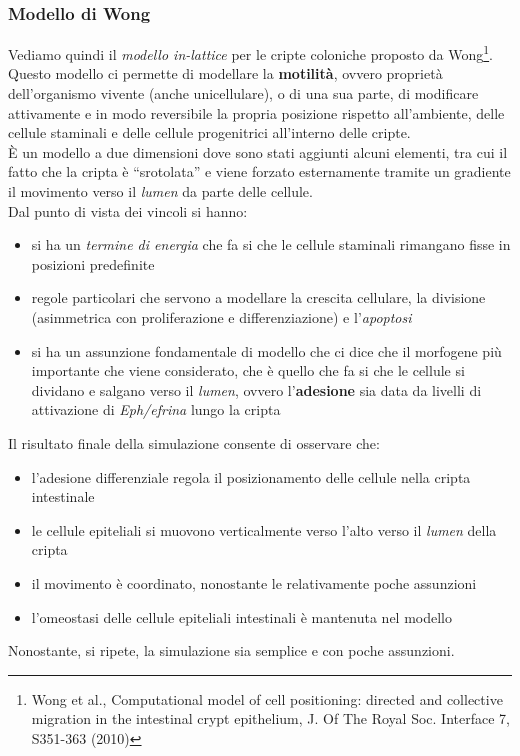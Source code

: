 \documentclass[a4paper,12pt, oneside]{book}
\begin{document}
\subsubsection{Modello di Wong}
Vediamo quindi il \textit{modello in-lattice} per le cripte coloniche proposto
da Wong\footnote{Wong et al., Computational model of cell positioning: 
directed and collective migration in the intestinal crypt epithelium, J. Of
The Royal Soc. Interface 7, S351-363 (2010)}.\\
Questo modello ci permette di modellare la \textbf{motilità}, ovvero proprietà
dell’organismo vivente (anche unicellulare), o di una sua parte, di modificare
attivamente e in modo reversibile la propria posizione rispetto all’ambiente,
delle cellule staminali e delle cellule progenitrici all'interno delle cripte.\\
È un modello a due dimensioni dove sono stati aggiunti alcuni elementi, tra cui
il fatto che la cripta è ``srotolata'' e viene forzato esternamente tramite un
gradiente il movimento verso il \textit{lumen} da parte delle cellule.\\
Dal punto di vista dei vincoli si hanno:
\begin{itemize}
  \item si ha un \textit{termine di energia} che fa si che le cellule staminali
  rimangano fisse in posizioni predefinite
  \item regole particolari che servono a modellare la crescita cellulare, la
  divisione (asimmetrica con proliferazione e differenziazione) e
  l'\textit{apoptosi} 
  \item si ha un assunzione fondamentale di modello che ci dice che il morfogene
  più importante che viene considerato, che è quello che fa si che le cellule si
  dividano e salgano verso il \textit{lumen}, ovvero l'\textbf{adesione} sia
  data da livelli di attivazione di \textit{Eph/efrina} lungo la cripta
\end{itemize}
Il risultato finale della simulazione consente di osservare che:
\begin{itemize}
  \item l'adesione differenziale regola il posizionamento delle cellule nella
  cripta intestinale 
  \item le cellule epiteliali si muovono verticalmente verso l'alto verso il
  \textit{lumen} della cripta  
  \item il movimento è coordinato, nonostante le relativamente poche assunzioni
  \item l'omeostasi delle cellule epiteliali intestinali è mantenuta nel modello
\end{itemize}
Nonostante, si ripete, la simulazione sia semplice e con poche assunzioni.
\end{document}
